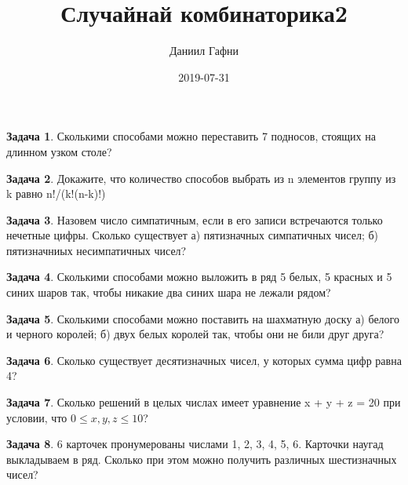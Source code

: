 \documentclass[a4paper,11pt]{article}%
\title{Случайнай комбинаторика2}%
\author{Даниил Гафни}%
\date{2019{-}07{-}31}%
\theoremstyle{definition}%
\newtheorem{Ex}{\hspace{-25pt}\fbox{\phantom{123}} Задача}%
\begin{document}
%
\normalsize%
\maketitle%
\begin{Ex}%
Сколькими способами можно переставить 7 подносов, стоящих на длинном узком столе?%
%
\end{Ex}%
%
\iffalse%
Автор: Ираклий Гагуа%
Дата: 07.01.2011%
Название: None%
Подсказка: \textbackslash{}\textbackslash{}%
nan%
\fi%
%
\begin{Ex}%
Докажите, что количество способов выбрать из n элементов  группу из k равно n!/(k!(n-k)!)%
%
\end{Ex}%
%
\iffalse%
Автор: 25 школа%
Дата: 01.07.2017%
Название: None%
Подсказка: \textbackslash{}\textbackslash{}%
nan%
\fi%
%
\begin{Ex}%
Назовем число симпатичным, если в его записи встречаются только
нечетные цифры. Сколько существует а) пятизначных симпатичных чисел;
б) пятизначниых несимпатичных чисел?%
%
\end{Ex}%
%
\iffalse%
Автор: 25 школа%
Дата: 01.11.2012%
Название: None%
Подсказка: \textbackslash{}\textbackslash{}%
nan%
\fi%
%
\begin{Ex}%
Сколькими способами можно выложить в ряд 5 белых, 5 красных и 5 синих
шаров так, чтобы никакие два синих шара не лежали рядом?%
%
\end{Ex}%
%
\iffalse%
Автор: Дмитрий Трущин%
Дата: 01.10.2013%
Название: None%
Подсказка: \textbackslash{}\textbackslash{}%
nan%
\fi%
%
\begin{Ex}%
Сколькими способами можно поставить на шахматную доску а) белого и
черного королей; б) двух белых королей так, чтобы они не били друг
друга?%
%
\end{Ex}%
%
\iffalse%
Автор: 25 школа%
Дата: 01.11.2012%
Название: None%
Подсказка: \textbackslash{}\textbackslash{}%
nan%
\fi%
%
\begin{Ex}%
Сколько существует десятизначных чисел, у которых сумма цифр равна 4?%
%
\end{Ex}%
%
\iffalse%
Автор: 25 школа%
Дата: 01.07.2017%
Название: None%
Подсказка: \textbackslash{}\textbackslash{}%
nan%
\fi%
%
\begin{Ex}%
Сколько решений в целых числах имеет уравнение x + y + z = 20 при условии,
что $0 \leq x, y, z \leq 10$?%
%
\end{Ex}%
%
\iffalse%
Автор: Дмитрий Трущин%
Дата: 01.10.2013%
Название: None%
Подсказка: \textbackslash{}\textbackslash{}%
nan%
\fi%
%
\begin{Ex}%
6 карточек пронумерованы числами 1, 2, 3, 4, 5, 6.
Карточки наугад выкладываем в ряд. Сколько при этом можно получить
различных шестизначных чисел?%
%
\end{Ex}%
\end{document}
